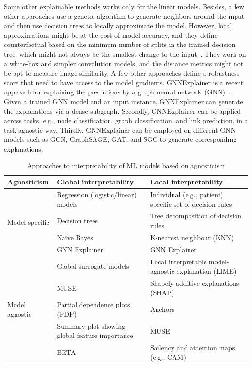 \hspace*{3.5mm} Some other explainable methods works only for the linear models. Besides, a few other approaches use a genetic algorithm to generate neighbors around the input and then use decision trees to locally approximate the model. However, local approximations might be at the cost of model accuracy, and they define counterfactual based on the minimum number of splits in the trained decision tree, which might not always be the smallest change to the input~\cite{li2017comprehensive}. They work on a white-box and simpler convolution models, and the distance metrics might not be apt to measure image similarity. A few other approaches define a robustness score that need to have access to the model gradients. GNNExplainer is a recent approach for explaining the predictions by a graph neural network~(GNN)~\cite{ying2019gnnexplainer}. Given a trained GNN model and an input instance, GNNExplainer can generate the explanations via a dense subgraph. Secondly, GNNExplainer can be applied across tasks, e.g., node classification, graph classification, and link prediction, in a task-agnostic way. Thirdly, GNNExplainer can be employed on different GNN models such as GCN, GraphSAGE, GAT, and SGC to generate corresponding explanations. 

\begin{table}[h]
    \centering
    \scriptsize
    \caption{Approaches to interpretability of ML models based on agnosticism}
    \label{tab:global_vs_lical_xai}
    \vspace{-2mm}
    \begin{tabular}{l|l|l} 
        \hline
        \textbf{Agnosticism}  & \textbf{Global interpretability}  & \textbf{Local interpretability} \\ 
        \hline
        \multirow{4}{*}{Model specific} & Regression (logistic/linear) models & Individual (e.g., patient) specific set of decision rules \\ 
        \cline{2-3}
        & Decision trees & Tree decomposition of decision rules \\ 
        \cline{2-3}
        & Naïve Bayes & K-nearest neighbour (KNN)\\ 
        \cline{2-3}
        & GNN Explainer~\cite{GNNEXPLAINER} & GNN Explainer~\cite{GNNEXPLAINER} \\ 
        \hline
        \multirow{5}{*}{Model agnostic} & Global surrogate models  & Local interpretable model-agnostic explanation (LIME)~\cite{LIME}\\ 
        \cline{2-3}
        &  MUSE  & Shapely additive explanations (SHAP)~\cite{SHAP}\\ 
        \cline{2-3}
        & Partial dependence plots (PDP) & Anchors~\cite{ribeiro2018anchors} \\ 
        \cline{2-3}
        & Summary plot showing global feature importance & MUSE \\ 
        \cline{2-3}
        & BETA~\cite{BETA} & Sailency and attention maps (e.g., CAM)\\ 
        \hline
    \end{tabular}
    \vspace{-4mm}
\end{table}

